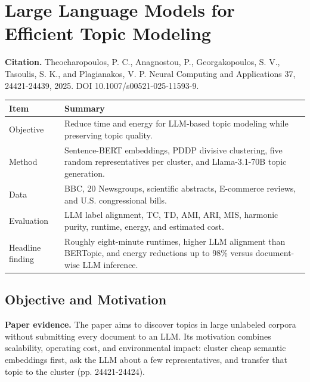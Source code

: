 \documentclass[11pt]{article}
\newcounter{none} %
\begin{document}
\clearpage
\section{Large Language Models for Efficient Topic
Modeling}\label{large-language-models-for-efficient-topic-modeling}

\textbf{Citation.} Theocharopoulos, P. C., Anagnostou, P.,
Georgakopoulos, S. V., Tasoulis, S. K., and Plagianakos, V. P. Neural
Computing and Applications 37, 24421-24439, 2025. DOI
10.1007/s00521-025-11593-9.

{\def\LTcaptype{none} %
\begin{longtable}[]{@{}
  >{\raggedright\arraybackslash}p{}
  >{\raggedright\arraybackslash}p{}@{}}
\toprule\noalign{}
\begin{minipage}[b]{\linewidth}\centering
\textbf{Item}
\end{minipage} & \begin{minipage}[b]{\linewidth}\centering
\textbf{Summary}
\end{minipage} \\
\midrule\noalign{}
\endhead
\bottomrule\noalign{}
\endlastfoot
Objective & Reduce time and energy for LLM-based topic modeling while
preserving topic quality. \\
Method & Sentence-BERT embeddings, PDDP divisive clustering, five random
representatives per cluster, and Llama-3.1-70B topic generation. \\
Data & BBC, 20 Newsgroups, scientific abstracts, E-commerce reviews, and
U.S. congressional bills. \\
Evaluation & LLM label alignment, TC, TD, AMI, ARI, MIS, harmonic
purity, runtime, energy, and estimated cost. \\
Headline finding & Roughly eight-minute runtimes, higher LLM alignment
than BERTopic, and energy reductions up to 98\% versus document-wise LLM
inference. \\
\end{longtable}
}

\subsection{Objective and Motivation}\label{objective-and-motivation-1}

\textbf{Paper evidence.} The paper aims to discover topics in large unlabeled corpora
without submitting every document to an LLM. Its motivation combines
scalability, operating cost, and environmental impact: cluster cheap
semantic embeddings first, ask the LLM about a few representatives, and
transfer that topic to the cluster (pp. 24421-24424).
\end{document}
